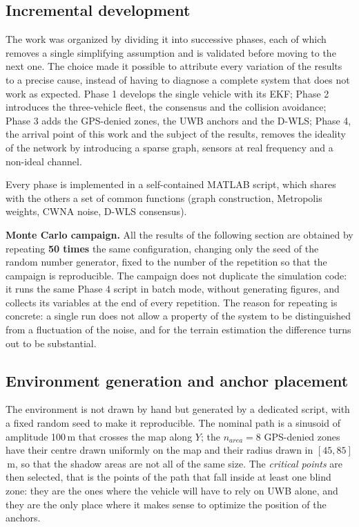 \documentclass[conference,9pt]{IEEEtran}
\begin{document}
\subsection{Incremental development}

The work was organized by dividing it into successive phases, each of which
removes a single simplifying assumption and is validated before moving to the
next one. The choice made it possible to attribute every variation of the
results to a precise cause, instead of having to diagnose a complete system
that does not work as expected. Phase 1 develops the single vehicle with its
EKF; Phase 2 introduces the three-vehicle fleet, the consensus and the
collision avoidance; Phase 3 adds the GPS-denied zones, the UWB anchors and the
D-WLS; Phase 4, the arrival point of this work and the subject of the results,
removes the ideality of the network by introducing a sparse graph, sensors at
real frequency and a non-ideal channel.

Every phase is implemented in a self-contained MATLAB script, which shares with
the others a set of common functions (graph construction, Metropolis weights,
CWNA noise, D-WLS consensus).

\textbf{Monte Carlo campaign.} All the results of the following section are
obtained by repeating \textbf{50 times} the same configuration, changing only
the seed of the random number generator, fixed to the number of the repetition
so that the campaign is reproducible. The campaign does not duplicate the
simulation code: it runs the same Phase 4 script in batch mode, without
generating figures, and collects its variables at the end of every repetition.
The reason for repeating is concrete: a single run does not allow a property of
the system to be distinguished from a fluctuation of the noise, and for the
terrain estimation the difference turns out to be substantial.

\subsection{Environment generation and anchor placement}
\label{sub:ambiente}

The environment is not drawn by hand but generated by a dedicated script, with
a fixed random seed to make it reproducible. The nominal path is a sinusoid of
amplitude 100\,m that crosses the map along $Y$; the $n_{area} = 8$ GPS-denied
zones have their centre drawn uniformly on the map and their radius drawn in
$[45, 85]$\,m, so that the shadow areas are not all of the same size. The
\emph{critical points} are then selected, that is the points of the path that
fall inside at least one blind zone: they are the ones where the vehicle will
have to rely on UWB alone, and they are the only place where it makes sense to
optimize the position of the anchors.
\end{document}
